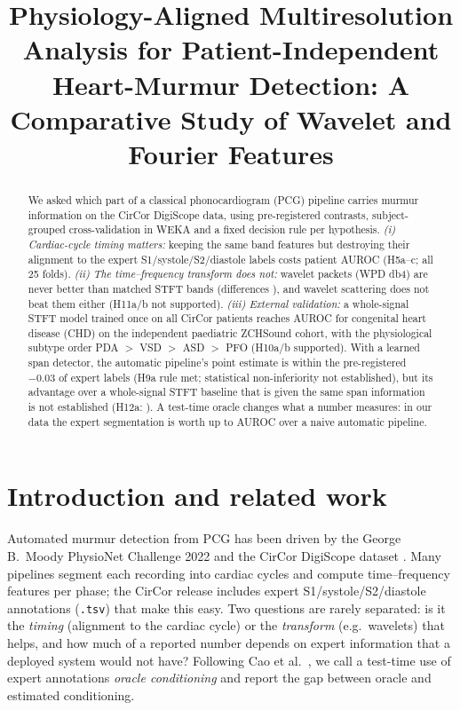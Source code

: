 \documentclass[conference]{IEEEtran}
\begin{document}
\title{Physiology-Aligned Multiresolution Analysis for Patient-Independent Heart-Murmur Detection: A Comparative Study of Wavelet and Fourier Features}
\author{}
\maketitle

\begin{abstract}
We asked which part of a classical phonocardiogram (PCG) pipeline carries murmur information on the CirCor DigiScope data,
using pre-registered contrasts, subject-grouped cross-validation in WEKA and a fixed decision rule per hypothesis.
\emph{(i) Cardiac-cycle timing matters:} keeping the same band features but destroying their alignment to the expert
S1/systole/S2/diastole labels costs  patient AUROC (H5a--c; all 25 folds). \emph{(ii) The
time--frequency transform does not:} wavelet packets (WPD db4) are never better than matched STFT bands (differences
), and wavelet scattering does not beat them either (H11a/b not supported). \emph{(iii) External
validation:} a whole-signal STFT model trained once on all CirCor patients reaches AUROC  for congenital heart
disease (CHD) on the independent paediatric ZCHSound cohort, with the physiological subtype order PDA $>$ VSD $>$ ASD $>$
PFO (H10a/b supported). With a learned span detector, the automatic pipeline's point estimate is within the pre-registered $-0.03$ of
expert labels (H9a rule met; statistical non-inferiority not established), but its advantage over a whole-signal STFT baseline that is given the same span information is not established
(H12a: ). A test-time oracle changes what a number measures: in our data the expert segmentation is worth
up to  AUROC over a naive automatic pipeline.
\end{abstract}

\section{Introduction and related work}
Automated murmur detection from PCG has been driven by the George B.\ Moody PhysioNet Challenge 2022 and the CirCor DigiScope
dataset \cite{oliveira2022,reyna2023}. Many pipelines segment each recording into cardiac cycles and compute time--frequency
features per phase; the CirCor release includes expert S1/systole/S2/diastole annotations (\texttt{.tsv}) that make this easy.
Two questions are rarely separated: is it the \emph{timing} (alignment to the cardiac cycle) or the \emph{transform}
(e.g.\ wavelets) that helps, and how much of a reported number depends on expert information that a deployed system would
not have? Following Cao et al.\ \cite{cao2026}, we call a test-time use of expert annotations \emph{oracle conditioning} and
report the gap between oracle and estimated conditioning.
\end{document}
